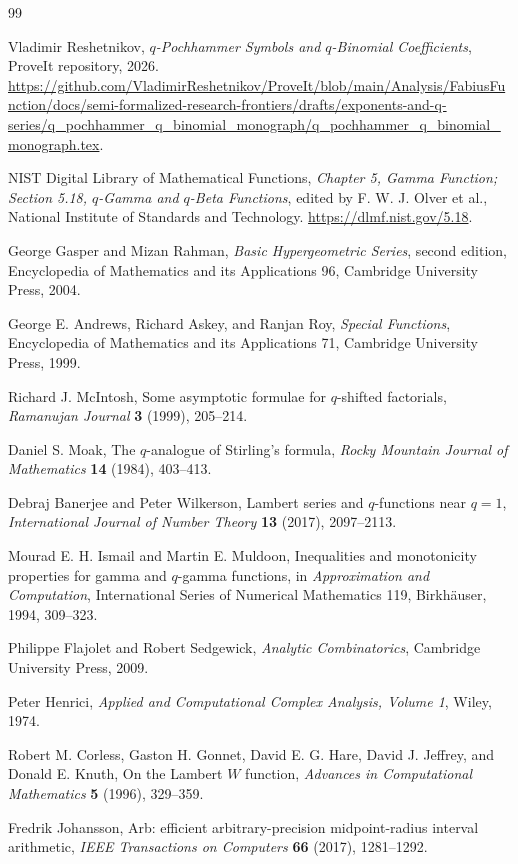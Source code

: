 \documentclass[11pt,oneside]{article}
\theoremstyle{definition}
\theoremstyle{remark}
\theoremstyle{plain}
\theoremstyle{definition}
\theoremstyle{remark}
\numberwithin{equation}{section}
\numberwithin{figure}{section}
\numberwithin{table}{section}
\begin{document}
\begin{thebibliography}{99}

Vladimir Reshetnikov,
\emph{\(q\)-Pochhammer Symbols and \(q\)-Binomial Coefficients},
ProveIt repository, 2026.
\url{https://github.com/VladimirReshetnikov/ProveIt/blob/main/Analysis/FabiusFunction/docs/semi-formalized-research-frontiers/drafts/exponents-and-q-series/q_pochhammer_q_binomial_monograph/q_pochhammer_q_binomial_monograph.tex}.

NIST Digital Library of Mathematical Functions,
\emph{Chapter 5, Gamma Function; Section 5.18, \(q\)-Gamma and \(q\)-Beta
Functions}, edited by F. W. J. Olver et al., National Institute of Standards
and Technology.
\url{https://dlmf.nist.gov/5.18}.

George Gasper and Mizan Rahman,
\emph{Basic Hypergeometric Series}, second edition,
Encyclopedia of Mathematics and its Applications 96,
Cambridge University Press, 2004.

George E. Andrews, Richard Askey, and Ranjan Roy,
\emph{Special Functions},
Encyclopedia of Mathematics and its Applications 71,
Cambridge University Press, 1999.

Richard J. McIntosh,
Some asymptotic formulae for \(q\)-shifted factorials,
\emph{Ramanujan Journal} \textbf{3} (1999), 205--214.

Daniel S. Moak,
The \(q\)-analogue of Stirling's formula,
\emph{Rocky Mountain Journal of Mathematics} \textbf{14} (1984), 403--413.

Debraj Banerjee and Peter Wilkerson,
Lambert series and \(q\)-functions near \(q=1\),
\emph{International Journal of Number Theory} \textbf{13} (2017), 2097--2113.

Mourad E. H. Ismail and Martin E. Muldoon,
Inequalities and monotonicity properties for gamma and \(q\)-gamma functions,
in \emph{Approximation and Computation}, International Series of Numerical
Mathematics 119, Birkh\"auser, 1994, 309--323.

Philippe Flajolet and Robert Sedgewick,
\emph{Analytic Combinatorics},
Cambridge University Press, 2009.

Peter Henrici,
\emph{Applied and Computational Complex Analysis, Volume 1},
Wiley, 1974.

Robert M. Corless, Gaston H. Gonnet, David E. G. Hare,
David J. Jeffrey, and Donald E. Knuth,
On the Lambert \(W\) function,
\emph{Advances in Computational Mathematics} \textbf{5} (1996), 329--359.

Fredrik Johansson,
Arb: efficient arbitrary-precision midpoint-radius interval arithmetic,
\emph{IEEE Transactions on Computers} \textbf{66} (2017), 1281--1292.

\end{thebibliography}
\end{document}
